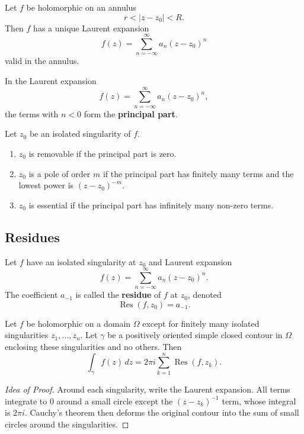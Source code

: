 \begin{theorem}
Let $f$ be holomorphic on an annulus
\[
    r<|z-z_0|<R.
\]
Then $f$ has a unique Laurent expansion
\[
    f(z)=\sum_{n=-\infty}^{\infty}a_n(z-z_0)^n
\]
valid in the annulus.
\end{theorem}

\begin{definition}
In the Laurent expansion
\[
    f(z)=\sum_{n=-\infty}^{\infty}a_n(z-z_0)^n,
\]
the terms with $n<0$ form the \textbf{principal part}.
\end{definition}

\newpage

\begin{proposition}
Let $z_0$ be an isolated singularity of $f$.
\begin{enumerate}
    \item $z_0$ is removable if the principal part is zero.
    \item $z_0$ is a pole of order $m$ if the principal part has finitely many terms and the lowest power is $(z-z_0)^{-m}$.
    \item $z_0$ is essential if the principal part has infinitely many non-zero terms.
\end{enumerate}
\end{proposition}

\subsection{Residues}

\begin{definition}[Residue]
Let $f$ have an isolated singularity at $z_0$ and Laurent expansion
\[
    f(z)=\sum_{n=-\infty}^{\infty}a_n(z-z_0)^n.
\]
The coefficient $a_{-1}$ is called the \textbf{residue} of $f$ at $z_0$, denoted
\[
    \operatorname{Res}(f,z_0)=a_{-1}.
\]
\end{definition}

\begin{theorem}
Let $f$ be holomorphic on a domain $\Omega$ except for finitely many isolated singularities $z_1,\dots,z_n$. Let $\gamma$ be a positively oriented simple closed contour in $\Omega$ enclosing these singularities and no others. Then
\[
    \int_\gamma f(z)\,dz=2\pi i\sum_{k=1}^{n}\operatorname{Res}(f,z_k).
\]
\end{theorem}

\begin{proof}[Idea of Proof]
Around each singularity, write the Laurent expansion. All terms integrate to $0$ around a small circle except the $(z-z_k)^{-1}$ term, whose integral is $2\pi i$. Cauchy's theorem then deforms the original contour into the sum of small circles around the singularities.
\end{proof}

